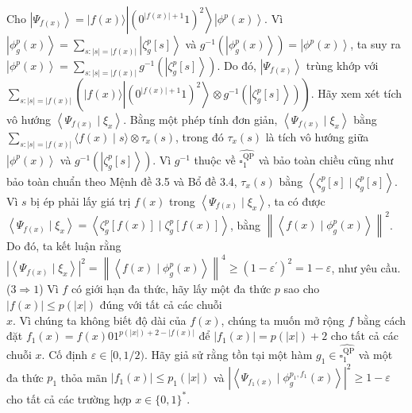 \documentclass[10pt]{article}
\begin{document}
Cho $\left|\Psi_{f(x)}\right\rangle=|f(x)\rangle\left|\left(0^{|f(x)|+1} 1\right)^{2}\right\rangle\left|\phi^{p}(x)\right\rangle$. Vì $\left|\phi_{g}^{p}(x)\right\rangle=\sum_{s:|s|=|f(x)|}\left|\zeta_{g}^{p}[s]\right\rangle$ và $g^{-1}\left(\left|\phi_{g}^{p}(x)\right\rangle\right)= \left|\phi^{p}(x)\right\rangle$, ta suy ra $\left|\phi^{p}(x)\right\rangle=\sum_{s:|s|=|f(x)|} g^{-1}\left(\left|\zeta_{g}^{p}[s]\right\rangle\right)$. Do đó, $\left|\Psi_{f(x)}\right\rangle$ trùng khớp với $\sum_{s:|s|=|f(x)|}\left(|f(x)\rangle\left|\left(0^{|f(x)|+1} 1\right)^{2}\right\rangle \otimes g^{-1}\left(\left|\zeta_{g}^{p}[s]\right\rangle\right)\right)$. Hãy xem xét tích vô hướng $\left\langle\Psi_{f(x)} \mid \xi_{x}\right\rangle$. Bằng một phép tính đơn giản, $\left\langle\Psi_{f(x)} \mid \xi_{x}\right\rangle$ bằng $\sum_{s:|s|=|f(x)|}\langle f(x) \mid s\rangle \otimes \tau_{x}(s)$, trong đó $\tau_{x}(s)$ là tích vô hướng giữa $\left|\phi^{p}(x)\right\rangle$ và $g^{-1}\left(\left|\zeta_{g}^{p}[s]\right\rangle\right)$. Vì $g^{-1}$ thuộc về $\widehat{\square_{1}^{\mathrm{QP}}}$ và bảo toàn chiều cũng như bảo toàn chuẩn theo Mệnh đề 3.5 và Bổ đề 3.4, $\tau_{x}(s)$ bằng $\left\langle\zeta_{g}^{p}[s] \mid \zeta_{g}^{p}[s]\right\rangle$. Vì $s$ bị ép phải lấy giá trị $f(x)$ trong $\left\langle\Psi_{f(x)} \mid \xi_{x}\right\rangle$, ta có được $\left\langle\Psi_{f(x)} \mid \xi_{x}\right\rangle=\left\langle\zeta_{g}^{p}[f(x)] \mid \zeta_{g}^{p}[f(x)]\right\rangle$, bằng $\left\|\left\langle f(x) \mid \phi_{g}^{p}(x)\right\rangle\right\|^{2}$. Do đó, ta kết luận rằng $\left|\left\langle\Psi_{f(x)} \mid \xi_{x}\right\rangle\right|^{2}=\left\|\left\langle f(x) \mid \phi_{g}^{p}(x)\right\rangle\right\|^{4} \geq\left(1-\varepsilon^{\prime}\right)^{2}=1-\varepsilon$, như yêu cầu.\\
($3 \Rightarrow 1$) Vì $f$ có giới hạn đa thức, hãy lấy một đa thức $p$ sao cho $|f(x)| \leq p(|x|)$ đúng với tất cả các chuỗi\\
$x$. Vì chúng ta không biết độ dài của $f(x)$, chúng ta muốn mở rộng $f$ bằng cách đặt $f_{1}(x)=f(x) 01^{p(|x|)+2-|f(x)|}$ để $\left|f_{1}(x)\right|=p(|x|)+2$ cho tất cả các chuỗi $x$. Cố định $\varepsilon \in[0,1 / 2)$. Hãy giả sử rằng tồn tại một hàm $g_{1} \in \widehat{\square_{1}^{\mathrm{QP}}}$ và một đa thức $p_{1}$ thỏa mãn $\left|f_{1}(x)\right| \leq p_{1}(|x|)$ và $\left|\left\langle\Psi_{f_{1}(x)} \mid \phi_{g}^{p_{1}, f_{1}}(x)\right\rangle\right|^{2} \geq 1-\varepsilon$ cho tất cả các trường hợp $x \in\{0,1\}^{*}$.
\end{document}
